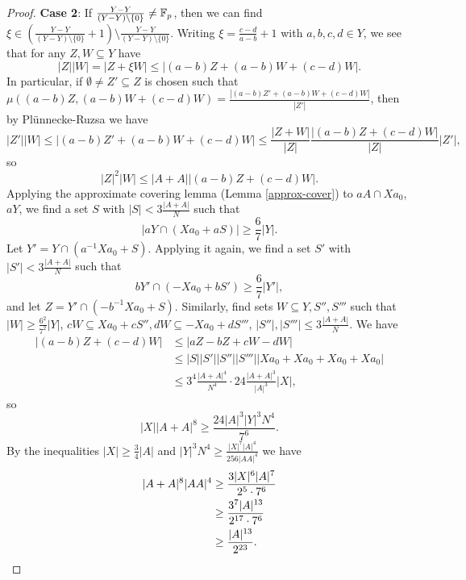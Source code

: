 \documentclass[letterpaper,11pt]{article}
\theoremstyle{definition}
\theoremstyle{remark}
\begin{document}
\begin{proof}
\textbf{Case 2}: If $\frac{Y-Y}{(Y-Y)\setminus\{0\}} \ne \mathbb{F}_p$, then we can find $\xi \in \left(\frac{Y-Y}{(Y-Y)\setminus\{0\}}+1\right) \setminus \frac{Y-Y}{(Y-Y)\setminus\{0\}}$. Writing $\xi = \frac{c-d}{a-b}+1$ with $a,b,c,d \in Y$, we see that for any $Z,W \subseteq Y$ have
\[
|Z||W| = |Z + \xi W| \le |(a-b)Z + (a-b)W + (c-d)W|.
\]
In particular, if $\emptyset \ne Z'\subseteq Z$ is chosen such that $\mu((a-b)Z,(a-b)W+(c-d)W) = \frac{|(a-b)Z' + (a-b)W + (c-d)W|}{|Z'|}$, then by Pl\"unnecke-Ruzsa we have
\[
|Z'||W| \le |(a-b)Z' + (a-b)W + (c-d)W| \le \frac{|Z+W|}{|Z|}\frac{|(a-b)Z+(c-d)W|}{|Z|}|Z'|,
\]
so
\[
|Z|^2|W| \le |A+A||(a-b)Z+(c-d)W|.
\]
Applying the approximate covering lemma (Lemma \ref{approx-cover}) to $aA\cap Xa_0$, $aY$, we find a set $S$ with $|S| < 3\frac{|A+A|}{N}$ such that
\[
|aY \cap (Xa_0+aS)| \ge \frac{6}{7}|Y|.
\]
Let $Y' = Y \cap (a^{-1}Xa_0+S)$. Applying it again, we find a set $S'$ with $|S'| < 3\frac{|A+A|}{N}$ such that
\[
bY' \cap (-Xa_0 + bS') \ge \frac{6}{7}|Y'|,
\]
and let $Z = Y' \cap (-b^{-1}Xa_0+S)$. Similarly, find sets $W\subseteq Y,S'',S'''$ such that $|W| \ge \frac{6^2}{7^2}|Y|$, $cW \subseteq Xa_0+cS'', dW \subseteq -Xa_0+dS'''$, $|S''|,|S'''| \le 3\frac{|A+A|}{N}$. We have
\begin{align*}
|(a-b)Z+(c-d)W| &\le |aZ-bZ+cW-dW|\\
&\le |S||S'||S''||S'''||Xa_0+Xa_0+Xa_0+Xa_0|\\
&\le 3^4\frac{|A+A|^4}{N^4}\cdot 24\frac{|A+A|^3}{|A|^3}|X|,
\end{align*}
so
\[
|X||A+A|^8 \ge \frac{24|A|^3|Y|^3N^4}{7^6}.
\]
By the inequalities $|X| \ge \frac{3}{4}|A|$ and $|Y|^3N^4 \ge \frac{|X|^7|A|^4}{256|AA|^4}$ we have
\begin{align*}
|A+A|^8|AA|^4 &\ge \frac{3|X|^6|A|^7}{2^5\cdot 7^6}\\
&\ge \frac{3^7|A|^{13}}{2^{17}\cdot 7^6}\\
&\ge \frac{|A|^{13}}{2^{23}}.\qedhere
\end{align*}
\end{proof}
\end{document}
